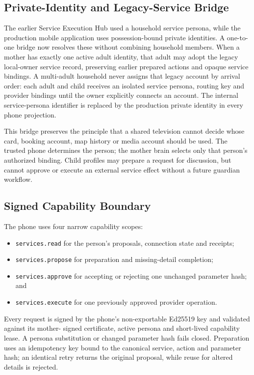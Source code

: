 \subsection{Private-Identity and Legacy-Service Bridge}

The earlier Service Execution Hub used a household service persona, while the production mobile
application uses possession-bound private identities.  A one-to-one bridge now resolves these
without combining household members.  When a mother has exactly one active adult identity, that
adult may adopt the legacy local-owner service record, preserving earlier prepared actions and
opaque service bindings.  A multi-adult household never assigns that legacy account by arrival
order: each adult and child receives an isolated service persona, routing key and provider bindings
until the owner explicitly connects an account.  The internal service-persona identifier is
replaced by the production private identity in every phone projection.

This bridge preserves the principle that a shared television cannot decide whose card, booking
account, map history or media account should be used.  The trusted phone determines the person;
the mother brain selects only that person's authorized binding.  Child profiles may prepare a
request for discussion, but cannot approve or execute an external service effect without a future
guardian workflow.

\subsection{Signed Capability Boundary}

The phone uses four narrow capability scopes:
\begin{itemize}
  \item \texttt{services.read} for the person's proposals, connection state and receipts;
  \item \texttt{services.propose} for preparation and missing-detail completion;
  \item \texttt{services.approve} for accepting or rejecting one unchanged parameter hash; and
  \item \texttt{services.execute} for one previously approved provider operation.
\end{itemize}

Every request is signed by the phone's non-exportable Ed25519 key and validated against its mother-
signed certificate, active persona and short-lived capability lease.  A persona substitution or
changed parameter hash fails closed.  Preparation uses an idempotency key bound to the canonical
service, action and parameter hash; an identical retry returns the original proposal, while reuse
for altered details is rejected.

